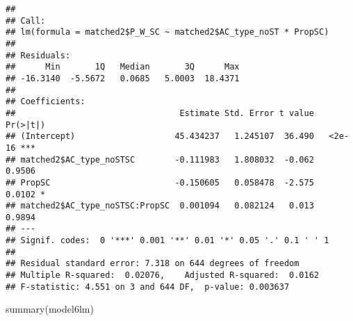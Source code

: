 \documentclass[
]{article}
\newenvironment{Shaded}{\begin{snugshade}}{\end{snugshade}}
\newcommand{\FunctionTok}[1]{\textcolor[rgb]{0.00,0.00,0.00}{#1}}
\newcommand{\NormalTok}[1]{#1}
\begin{document}
\begin{verbatim}
## 
## Call:
## lm(formula = matched2$P_W_SC ~ matched2$AC_type_noST * PropSC)
## 
## Residuals:
##      Min       1Q   Median       3Q      Max 
## -16.3140  -5.5672   0.0685   5.0003  18.4371 
## 
## Coefficients:
##                                 Estimate Std. Error t value Pr(>|t|)    
## (Intercept)                    45.434237   1.245107  36.490   <2e-16 ***
## matched2$AC_type_noSTSC        -0.111983   1.808032  -0.062   0.9506    
## PropSC                         -0.150605   0.058478  -2.575   0.0102 *  
## matched2$AC_type_noSTSC:PropSC  0.001094   0.082124   0.013   0.9894    
## ---
## Signif. codes:  0 '***' 0.001 '**' 0.01 '*' 0.05 '.' 0.1 ' ' 1
## 
## Residual standard error: 7.318 on 644 degrees of freedom
## Multiple R-squared:  0.02076,    Adjusted R-squared:  0.0162 
## F-statistic: 4.551 on 3 and 644 DF,  p-value: 0.003637
\end{verbatim}

\begin{Shaded}
\begin{Highlighting}[]
\FunctionTok{summary}\NormalTok{(model6lm)}
\end{Highlighting}
\end{Shaded}
\end{document}
